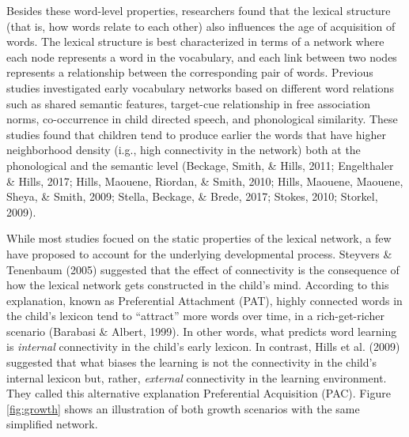 \documentclass[10pt, letterpaper]{article}
\begin{document}
Besides these word-level properties, researchers found that the lexical
structure (that is, how words relate to each other) also influences the
age of acquisition of words. The lexical structure is best characterized
in terms of a network where each node represents a word in the
vocabulary, and each link between two nodes represents a relationship
between the corresponding pair of words. Previous studies investigated
early vocabulary networks based on different word relations such as
shared semantic features, target-cue relationship in free association
norms, co-occurrence in child directed speech, and phonological
similarity. These studies found that children tend to produce earlier
the words that have higher neighborhood density (i.g., high connectivity
in the network) both at the phonological and the semantic level
(Beckage, Smith, \& Hills, 2011; Engelthaler \& Hills, 2017; Hills,
Maouene, Riordan, \& Smith, 2010; Hills, Maouene, Maouene, Sheya, \&
Smith, 2009; Stella, Beckage, \& Brede, 2017; Stokes, 2010; Storkel,
2009).

While most studies focued on the static properties of the lexical
network, a few have proposed to account for the underlying developmental
process. Steyvers \& Tenenbaum (2005) suggested that the effect of
connectivity is the consequence of how the lexical network gets
constructed in the child's mind. According to this explanation, known as
Preferential Attachment (PAT), highly connected words in the child's
lexicon tend to ``attract'' more words over time, in a rich-get-richer
scenario (Barabasi \& Albert, 1999). In other words, what predicts word
learning is \emph{internal} connectivity in the child's early lexicon.
In contrast, Hills et al. (2009) suggested that what biases the learning
is not the connectivity in the child's internal lexicon but, rather,
\emph{external} connectivity in the learning environment. They called
this alternative explanation Preferential Acquisition (PAC). Figure
\ref{fig:growth} shows an illustration of both growth scenarios with the
same simplified network.
\end{document}
